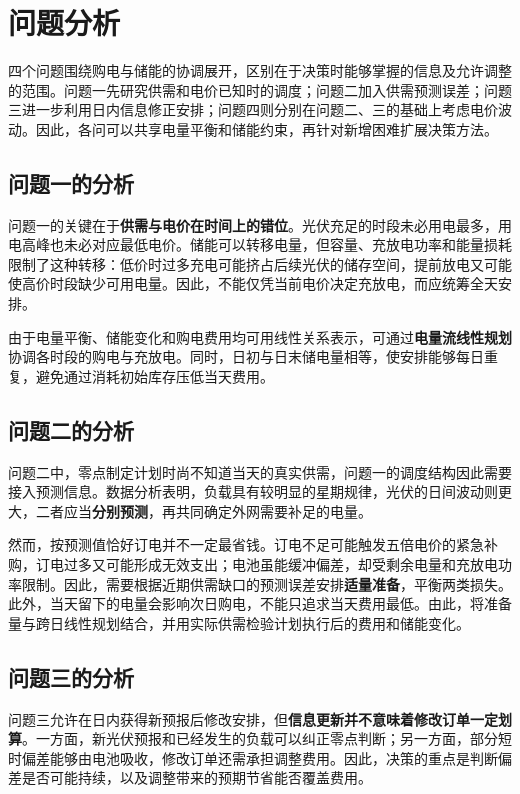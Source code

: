 \section{问题分析}

四个问题围绕购电与储能的协调展开，区别在于决策时能够掌握的信息及允许调整的范围。问题一先研究供需和电价已知时的调度；问题二加入供需预测误差；问题三进一步利用日内信息修正安排；问题四则分别在问题二、三的基础上考虑电价波动。因此，各问可以共享电量平衡和储能约束，再针对新增困难扩展决策方法。

\subsection{问题一的分析}

问题一的关键在于\textbf{供需与电价在时间上的错位}。光伏充足的时段未必用电最多，用电高峰也未必对应最低电价。储能可以转移电量，但容量、充放电功率和能量损耗限制了这种转移：低价时过多充电可能挤占后续光伏的储存空间，提前放电又可能使高价时段缺少可用电量。因此，不能仅凭当前电价决定充放电，而应统筹全天安排。

由于电量平衡、储能变化和购电费用均可用线性关系表示，可通过\textbf{电量流线性规划}协调各时段的购电与充放电。同时，日初与日末储电量相等，使安排能够每日重复，避免通过消耗初始库存压低当天费用。

\subsection{问题二的分析}

问题二中，零点制定计划时尚不知道当天的真实供需，问题一的调度结构因此需要接入预测信息。数据分析表明，负载具有较明显的星期规律，光伏的日间波动则更大，二者应当\textbf{分别预测}，再共同确定外网需要补足的电量。

然而，按预测值恰好订电并不一定最省钱。订电不足可能触发五倍电价的紧急补购，订电过多又可能形成无效支出；电池虽能缓冲偏差，却受剩余电量和充放电功率限制。因此，需要根据近期供需缺口的预测误差安排\textbf{适量准备}，平衡两类损失。此外，当天留下的电量会影响次日购电，不能只追求当天费用最低。由此，将准备量与跨日线性规划结合，并用实际供需检验计划执行后的费用和储能变化。

\subsection{问题三的分析}

问题三允许在日内获得新预报后修改安排，但\textbf{信息更新并不意味着修改订单一定划算}。一方面，新光伏预报和已经发生的负载可以纠正零点判断；另一方面，部分短时偏差能够由电池吸收，修改订单还需承担调整费用。因此，决策的重点是判断偏差是否可能持续，以及调整带来的预期节省能否覆盖费用。

